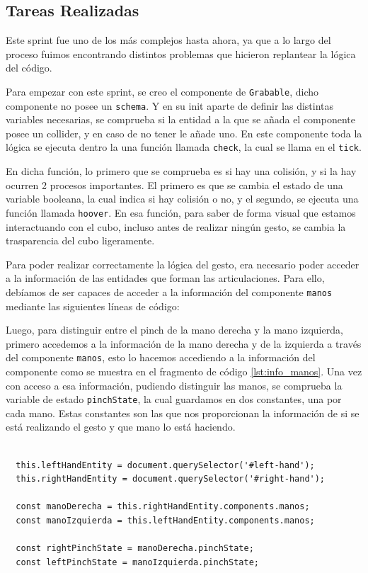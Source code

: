 \documentclass[a4paper, 12pt]{book}
\begin{document}
\subsection{Tareas Realizadas}
\label{subsec:implementacion5}
Este sprint fue uno de los más complejos hasta ahora, ya que a lo largo del proceso fuimos encontrando distintos problemas que hicieron replantear la lógica del código. 

Para empezar con este sprint, se creo el componente de \texttt{Grabable}, dicho componente no posee un \texttt{schema}. Y en su init aparte de definir las distintas variables necesarias, se comprueba si la entidad a la que se añada el componente posee un collider, y en caso de no tener le añade uno.
En este componente toda la lógica se ejecuta dentro la una función llamada \texttt{check}, la cual se llama en el \texttt{tick}. 

En dicha función, lo primero que se comprueba es si hay una colisión, y si la hay ocurren 2 procesos importantes. El primero es que se cambia el estado de una variable booleana, la cual indica si hay colisión o no, y el segundo, se ejecuta una función llamada \texttt{hoover}. En esa función, para saber de forma visual que estamos interactuando con el cubo, incluso antes de realizar ningún gesto, se cambia la trasparencia del cubo ligeramente.

Para poder realizar correctamente la lógica del gesto, era necesario poder acceder a la información de las entidades que forman las articulaciones. Para ello, debíamos de ser capaces de acceder a la información del componente \texttt{manos} mediante las siguientes líneas de código:

Luego, para distinguir entre el pinch de la mano derecha y la mano izquierda, primero accedemos a la información de la mano derecha y de la izquierda a través del componente \texttt{manos}, esto lo hacemos accediendo a la información del componente como se muestra en el fragmento de código \ref{lst:info_manos}. Una vez con acceso a esa información, pudiendo distinguir las manos, se comprueba la variable de estado \texttt{pinchState}, la cual guardamos en dos constantes, una por cada mano. Estas constantes son las que nos proporcionan la información de si se está realizando el gesto y que mano lo está haciendo.

\begin{lstlisting}[caption=Acceso información componente manos, captionpos=b, label=lst:info_manos]
  
  this.leftHandEntity = document.querySelector('#left-hand');
  this.rightHandEntity = document.querySelector('#right-hand');

  const manoDerecha = this.rightHandEntity.components.manos;
  const manoIzquierda = this.leftHandEntity.components.manos;

  const rightPinchState = manoDerecha.pinchState;
  const leftPinchState = manoIzquierda.pinchState;
\end{lstlisting}
\end{document}
